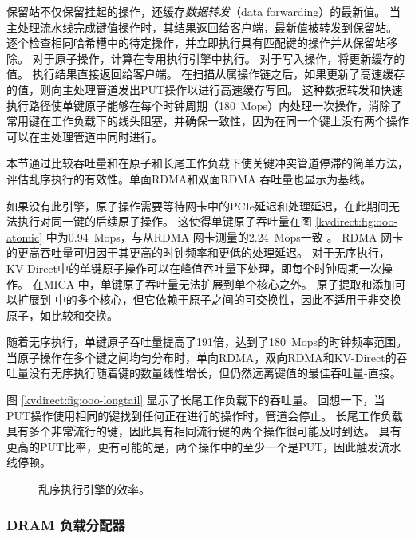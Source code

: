 保留站不仅保留挂起的操作，还缓存\textit {数据转发}（data forwarding）的最新值。
当主处理流水线完成键值操作时，其结果返回给客户端，最新值被转发到保留站。
逐个检查相同哈希槽中的待定操作，并立即执行具有匹配键的操作并从保留站移除。
对于原子操作，计算在专用执行引擎中执行。
对于写入操作，将更新缓存的值。
执行结果直接返回给客户端。
在扫描从属操作链之后，如果更新了高速缓存的值，则向主处理管道发出PUT操作以进行高速缓存写回。
这种数据转发和快速执行路径使单键原子能够在每个时钟周期（180~Mops）内处理一次操作，消除了常用键在工作负载下的线头阻塞，并确保一致性，因为在同一个键上没有两个操作可以在主处理管道中同时进行。


\label{kvdirect:sec:ooo-eval}

本节通过比较吞吐量和在原子和长尾工作负载下使关键冲突管道停滞的简单方法，评估乱序执行的有效性。单面RDMA和双面RDMA \cite {kalia2016design}吞吐量也显示为基线。

如果没有此引擎，原子操作需要等待网卡中的PCIe延迟和处理延迟，在此期间无法执行对同一键的后续原子操作。
这使得单键原子吞吐量在图 \ref{kvdirect:fig:ooo-atomic} 中为0.94~Mops，与从RDMA 网卡测量的2.24~Mops一致 \cite {kalia2016design}。
RDMA 网卡的更高吞吐量可归因于其更高的时钟频率和更低的处理延迟。
对于无序执行，KV-Direct中的单键原子操作可以在峰值吞吐量下处理，即每个时钟周期一次操作。
在MICA \cite {lim2014mica} 中，单键原子吞吐量无法扩展到单个核心之外。
原子提取和添加可以扩展到 \cite {kalia2016design} 中的多个核心，但它依赖于原子之间的可交换性，因此不适用于非交换原子，如比较和交换。

随着无序执行，单键原子吞吐量提高了191倍，达到了180~Mops的时钟频率范围。
当原子操作在多个键之间均匀分布时，单向RDMA，双向RDMA和KV-Direct的吞吐量没有无序执行随着键的数量线性增长，但仍然远离键值的最佳吞吐量-直接。

图 \ref {kvdirect:fig:ooo-longtail} 显示了长尾工作负载下的吞吐量。
回想一下，当PUT操作使用相同的键找到任何正在进行的操作时，管道会停止。
长尾工作负载具有多个非常流行的键，因此具有相同流行键的两个操作很可能及时到达。
具有更高的PUT比率，更有可能的是，两个操作中的至少一个是PUT，因此触发流水线停顿。


\begin{figure}[htbp]
	\centering
	\caption{乱序执行引擎的效率。}
	\label{kvdirect:fig:ooo-eval}
\end{figure}



\subsubsection{DRAM 负载分配器}
\label{kvdirect:sec:dram-cache}

